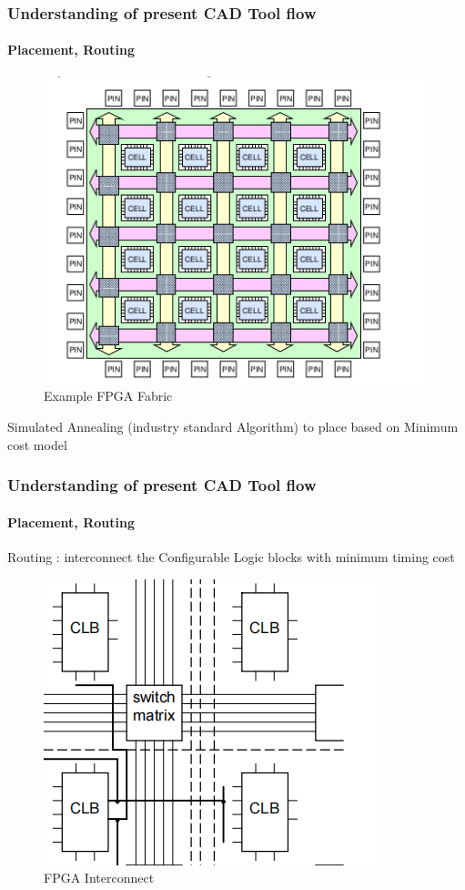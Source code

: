 \documentclass{beamer}
\begin{document}
\begin{frame}[fragile]
    \frametitle{Understanding of present CAD Tool flow}
    \framesubtitle{Placement, Routing}
    \begin{figure}
        \centering
        \includegraphics[width=0.5\linewidth]{slides/images/FPGA_Fabric.png}
        \caption{Example FPGA Fabric}
        \label{exa-fabric}
    \end{figure}
    
        Simulated Annealing (industry standard Algorithm) to place based on Minimum cost model 
    
\end{frame}

\begin{frame}[fragile]
    \frametitle{Understanding of present CAD Tool flow}
    \framesubtitle{Placement, Routing}
    
         Routing : interconnect the Configurable Logic  blocks with minimum timing cost 
\begin{figure}
        \centering
        \includegraphics[width=0.5\linewidth]{slides/images/switch_matrix.png}
        \caption{FPGA Interconnect }
        \label{exa_interconnect}
    \end{figure}
       
\end{frame}
\end{document}
